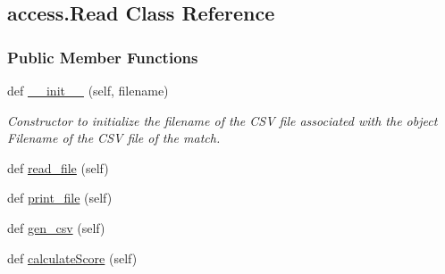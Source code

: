 \hypertarget{classaccess_1_1Read}{}\subsection{access.\+Read Class Reference}
\label{classaccess_1_1Read}
\subsubsection*{Public Member Functions}
\begin{DoxyCompactItemize}
\item 
def \hyperlink{classaccess_1_1Read_a2b5862fb02d0f371039b129c549356fc}{\+\_\+\+\_\+init\+\_\+\+\_\+} (self, filename)
\begin{DoxyCompactList}\small\item\em Constructor to initialize the filename of the C\+SV file associated with the object Filename of the C\+SV file of the match. \end{DoxyCompactList}\item 
def \hyperlink{classaccess_1_1Read_aeaf32257315cd5e6b99ce4bfef2d0bdb}{read\+\_\+file} (self)
\item 
def \hyperlink{classaccess_1_1Read_af9ec59006c0081393da1c4e3d8842208}{print\+\_\+file} (self)
\item 
def \hyperlink{classaccess_1_1Read_a9fbc3733d085156a8ee1ac59327483d1}{gen\+\_\+csv} (self)
\item 
def \hyperlink{classaccess_1_1Read_a428ebf658bf3d2c447840ac58ef9f406}{calculate\+Score} (self)
\end{DoxyCompactItemize}
